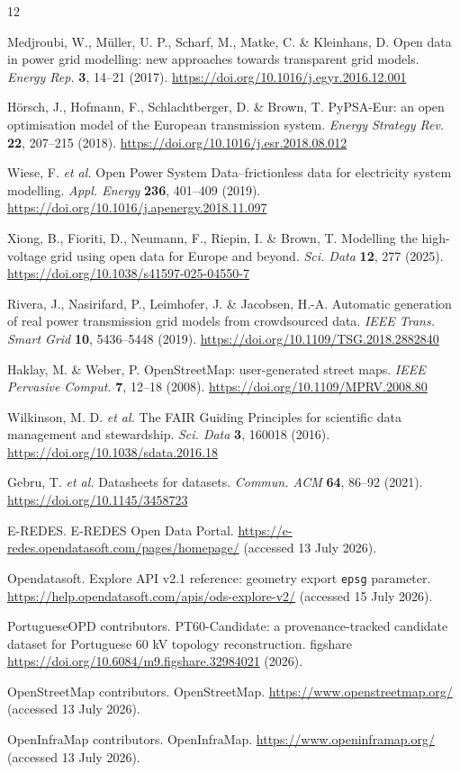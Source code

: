 \documentclass[10pt]{article}
\newcommand{\code}[1]{\texttt{#1}}
\newcommand{\doi}[1]{\url{https://doi.org/#1}}
\begin{document}
\begin{thebibliography}{12}

Medjroubi, W., Müller, U. P., Scharf, M., Matke, C. \& Kleinhans, D. Open data in power grid modelling: new approaches towards transparent grid models. \emph{Energy Rep.} \textbf{3}, 14--21 (2017). \doi{10.1016/j.egyr.2016.12.001}

Hörsch, J., Hofmann, F., Schlachtberger, D. \& Brown, T. PyPSA-Eur: an open optimisation model of the European transmission system. \emph{Energy Strategy Rev.} \textbf{22}, 207--215 (2018). \doi{10.1016/j.esr.2018.08.012}

Wiese, F. \emph{et al.} Open Power System Data--frictionless data for electricity system modelling. \emph{Appl. Energy} \textbf{236}, 401--409 (2019). \doi{10.1016/j.apenergy.2018.11.097}

Xiong, B., Fioriti, D., Neumann, F., Riepin, I. \& Brown, T. Modelling the high-voltage grid using open data for Europe and beyond. \emph{Sci. Data} \textbf{12}, 277 (2025). \doi{10.1038/s41597-025-04550-7}

Rivera, J., Nasirifard, P., Leimhofer, J. \& Jacobsen, H.-A. Automatic generation of real power transmission grid models from crowdsourced data. \emph{IEEE Trans. Smart Grid} \textbf{10}, 5436--5448 (2019). \doi{10.1109/TSG.2018.2882840}

Haklay, M. \& Weber, P. OpenStreetMap: user-generated street maps. \emph{IEEE Pervasive Comput.} \textbf{7}, 12--18 (2008). \doi{10.1109/MPRV.2008.80}

Wilkinson, M. D. \emph{et al.} The FAIR Guiding Principles for scientific data management and stewardship. \emph{Sci. Data} \textbf{3}, 160018 (2016). \doi{10.1038/sdata.2016.18}

Gebru, T. \emph{et al.} Datasheets for datasets. \emph{Commun. ACM} \textbf{64}, 86--92 (2021). \doi{10.1145/3458723}

E-REDES. E-REDES Open Data Portal. \url{https://e-redes.opendatasoft.com/pages/homepage/} (accessed 13 July 2026).

Opendatasoft. Explore API v2.1 reference: geometry export \code{epsg} parameter. \url{https://help.opendatasoft.com/apis/ods-explore-v2/} (accessed 15 July 2026).

PortugueseOPD contributors. PT60-Candidate: a provenance-tracked candidate dataset for Portuguese 60 kV topology reconstruction. figshare \doi{10.6084/m9.figshare.32984021} (2026).

OpenStreetMap contributors. OpenStreetMap. \url{https://www.openstreetmap.org/} (accessed 13 July 2026).

OpenInfraMap contributors. OpenInfraMap. \url{https://www.openinframap.org/} (accessed 13 July 2026).

\end{thebibliography}
\end{document}
